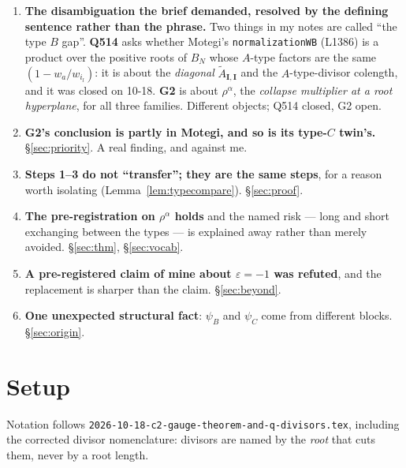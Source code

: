 \documentclass[11pt]{article}
\theoremstyle{definition}
\newcommand{\At}{\widetilde{A}}
\newcommand{\bI}{\mathbf{I}}
\begin{document}
\begin{enumerate}
\item \textbf{The disambiguation the brief demanded, resolved by the defining
  sentence rather than the phrase.}  Two things in my notes are called ``the
  type $B$ gap''.  \textbf{Q514} asks whether Motegi's \texttt{normalizationWB}
  (L1386) is a product over the positive roots of $B_N$ whose $A$-type factors
  are the same $(1-w_a/w_{i_l})$: it is about the \emph{diagonal}
  $\At_{\bI,\bI}$ and the $A$-type-divisor colength, and it was closed on 10-18.
  \textbf{G2} is about $\rho^{\alpha}$, the \emph{collapse multiplier at a root
  hyperplane}, for all three families.  Different objects; Q514 closed, G2 open.
\item \textbf{G2's conclusion is partly in Motegi, and so is its type-$C$
  twin's.}  \S\ref{sec:priority}.  A real finding, and against me.
\item \textbf{Steps 1--3 do not ``transfer''; they are the same steps}, for a
  reason worth isolating (Lemma~\ref{lem:typecompare}).  \S\ref{sec:proof}.
\item \textbf{The pre-registration on $\rho^{\alpha}$ holds} and the named risk
  --- long and short exchanging between the types --- is explained away rather
  than merely avoided.  \S\ref{sec:thm}, \S\ref{sec:vocab}.
\item \textbf{A pre-registered claim of mine about $\varepsilon=-1$ was
  refuted}, and the replacement is sharper than the claim.
  \S\ref{sec:beyond}.
\item \textbf{One unexpected structural fact}: $\psi_B$ and $\psi_C$ come from
  different blocks.  \S\ref{sec:origin}.
\end{enumerate}

\section{Setup}
\label{sec:setup}

Notation follows \texttt{2026-10-18-c2-gauge-theorem-and-q-divisors.tex},
including the corrected divisor nomenclature: divisors are named by the
\emph{root} that cuts them, never by a root length.
\end{document}
